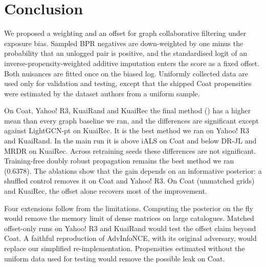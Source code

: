 \section{Conclusion}\label{sec:conclusion}

We proposed a weighting and an offset for graph collaborative filtering under exposure bias. Sampled BPR
negatives are down-weighted by one minus the probability that an unlogged pair is positive, and the standardised
logit of an inverse-propensity-weighted additive imputation enters the score as a fixed offset. Both nuisances
are fitted once on the biased log. Uniformly collected data are used only for validation and testing, except that
the shipped Coat propensities were estimated by the dataset authors from a uniform sample.

On Coat, Yahoo! R3, KuaiRand and KuaiRec the final method (\qp) has a higher mean than every graph baseline we
ran, and the differences are significant except against LightGCN-pt on KuaiRec. It is the best method we ran on
Yahoo! R3 and KuaiRand. In the main run it is above iALS on Coat and below DR-JL and MRDR on KuaiRec. Across retraining
seeds these differences are not significant. Training-free doubly robust propagation remains the best method we
ran (0.6378). The ablations show that the gain depends on an informative posterior: a shuffled control removes it
on Coat and Yahoo! R3. On Coat (unmatched grids) and KuaiRec, the offset alone recovers most of the improvement.

Four extensions follow from the limitations. Computing the posterior on the fly would remove the memory limit of
dense matrices on large catalogues. Matched offset-only runs on Yahoo! R3 and KuaiRand would test the offset claim
beyond Coat. A faithful reproduction of AdvInfoNCE, with its original adversary, would replace our simplified
re-implementation. Propensities estimated without the uniform data used for testing would remove the possible
leak on Coat.
